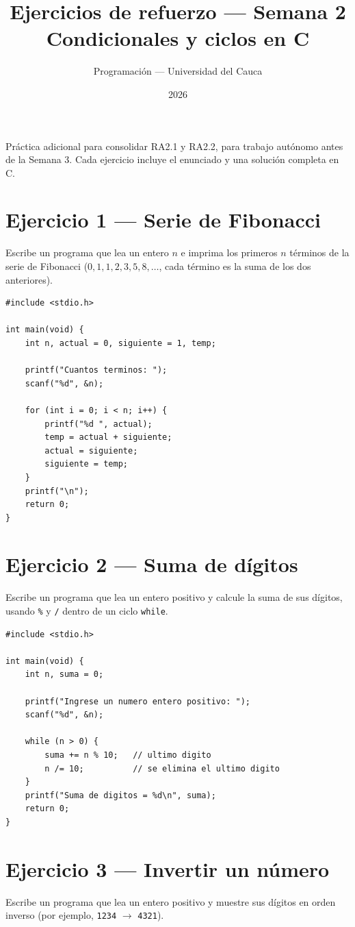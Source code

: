 \documentclass[11pt,letterpaper]{article}
\title{\textcolor{unicaucaverde}{Ejercicios de refuerzo --- Semana 2}\\[4pt]
  \large Condicionales y ciclos en C}
\author{Programación --- Universidad del Cauca}
\date{2026}
\begin{document}
\maketitle

Práctica adicional para consolidar RA2.1 y RA2.2, para trabajo autónomo antes de la Semana 3. Cada
ejercicio incluye el enunciado y una solución completa en C.

\section*{Ejercicio 1 --- Serie de Fibonacci}
Escribe un programa que lea un entero $n$ e imprima los primeros $n$ términos de la serie de
Fibonacci ($0, 1, 1, 2, 3, 5, 8, \dots$, cada término es la suma de los dos anteriores).

\begin{lstlisting}
#include <stdio.h>

int main(void) {
    int n, actual = 0, siguiente = 1, temp;

    printf("Cuantos terminos: ");
    scanf("%d", &n);

    for (int i = 0; i < n; i++) {
        printf("%d ", actual);
        temp = actual + siguiente;
        actual = siguiente;
        siguiente = temp;
    }
    printf("\n");
    return 0;
}
\end{lstlisting}

\section*{Ejercicio 2 --- Suma de dígitos}
Escribe un programa que lea un entero positivo y calcule la suma de sus dígitos, usando \texttt{\%}
y \texttt{/} dentro de un ciclo \texttt{while}.

\begin{lstlisting}
#include <stdio.h>

int main(void) {
    int n, suma = 0;

    printf("Ingrese un numero entero positivo: ");
    scanf("%d", &n);

    while (n > 0) {
        suma += n % 10;   // ultimo digito
        n /= 10;          // se elimina el ultimo digito
    }
    printf("Suma de digitos = %d\n", suma);
    return 0;
}
\end{lstlisting}

\section*{Ejercicio 3 --- Invertir un número}
Escribe un programa que lea un entero positivo y muestre sus dígitos en orden inverso (por
ejemplo, \texttt{1234} $\to$ \texttt{4321}).
\end{document}
